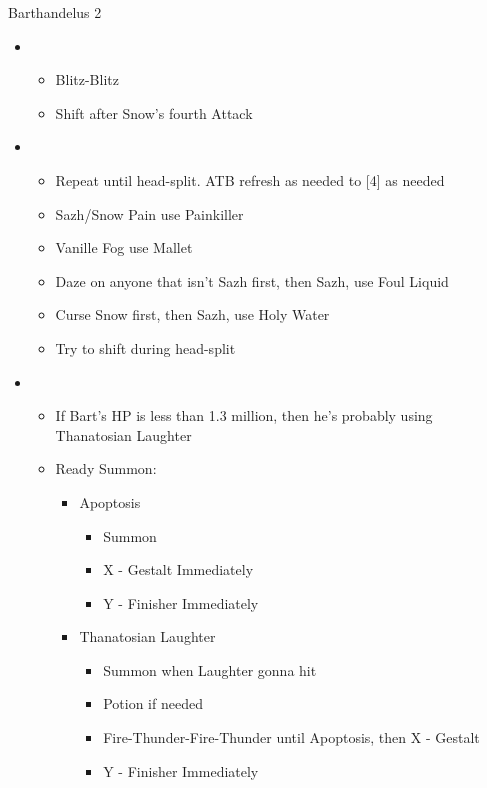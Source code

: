 \begin{battle}{Barthandelus 2}
\begin{multicols}{2}
\begin{itemize}
\begin{itemize}
    \end{itemize}
    \item \fourth
    \begin{itemize}
        \item Blitz-Blitz
        \item Shift after Snow's fourth Attack
    \end{itemize}
    \item \sixth
    \begin{itemize}
        \item Repeat until head-split. ATB refresh as needed to [4] as needed
        \item Sazh/Snow Pain use Painkiller
        \item Vanille Fog use Mallet
        \item Daze on anyone that isn't Sazh first, then Sazh, use Foul Liquid
        \item Curse Snow first, then Sazh, use Holy Water
        \item Try to shift during head-split
    \end{itemize}
    \item \fifth
    \begin{itemize}
        \item If Bart's HP is less than 1.3 million, then he's probably using Thanatosian Laughter
        \item Ready Summon:
        \begin{itemize}
            \item Apoptosis
            \begin{itemize}
                \item Summon
                \item X - Gestalt Immediately
                \item Y - Finisher Immediately
            \end{itemize}
            \item Thanatosian Laughter
            \begin{itemize}
                \item Summon when Laughter gonna hit
                \item Potion if needed
                \item Fire-Thunder-Fire-Thunder until Apoptosis, then X - Gestalt
                \item Y - Finisher Immediately
            \end{itemize}
        \end{itemize}

\end{itemize}
\end{itemize}
\end{multicols}
\end{battle}
